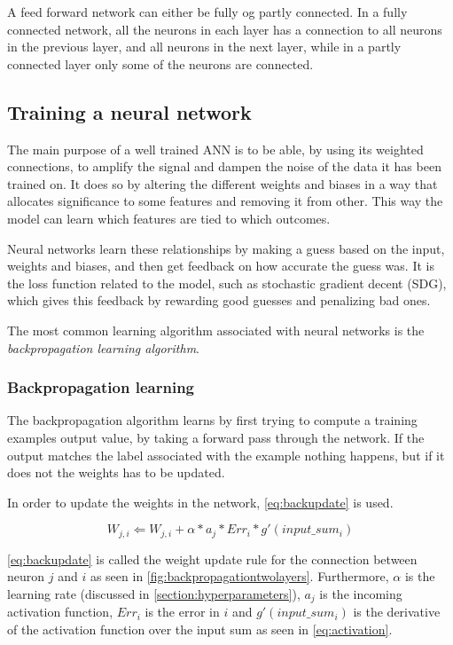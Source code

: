 A feed forward network can either be fully og partly connected. In a fully connected network, all the neurons in each layer has a connection to all neurons in the previous layer, and all neurons in the next layer, while in a partly connected layer only some of the neurons are connected.

\subsection{Training a neural network}
The main purpose of a well trained ANN is to be able, by using its weighted connections, to amplify the signal and dampen the noise of the data it has been trained on. It does so by altering the different weights and biases in a way that allocates significance to some features and removing it from other. This way the model can learn which features are tied to which outcomes.

Neural networks learn these relationships by making a guess based on the input, weights and biases, and then get feedback on how accurate the guess was. It is the loss function related to the model, such as stochastic gradient decent (SDG), which gives this feedback by rewarding good guesses and penalizing bad ones.

The most common learning algorithm associated with neural networks is the \textit{backpropagation learning algorithm}.

\subsubsection{Backpropagation learning}
The backpropagation algorithm learns by first trying to compute a training examples output value, by taking a forward pass through the network. If the output matches the label associated with the example nothing happens, but if it does not the weights has to be updated.

In order to update the weights in the network, \autoref{eq:backupdate} is used.

\begin{equation}\label{eq:backupdate}
	W_{j,i} \Leftarrow W_{j,i}+ \alpha*a_{j}*Err_{i}*g'(input\_sum_{i})
\end{equation}

\autoref{eq:backupdate} is called the weight update rule for the connection between neuron $j$ and $i$ as seen in \autoref{fig:backpropagationtwolayers}. Furthermore, $\alpha$ is the learning rate (discussed in \autoref{section:hyperparameters}), $a_{j}$ is the incoming activation function, $Err_{i}$ is the error in $i$ and $g'(input\_sum_{i})$ is the derivative of the activation function over the input sum as seen in \autoref{eq:activation}.

